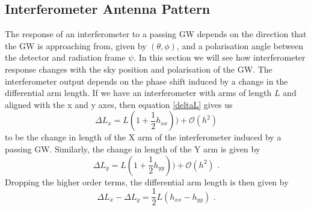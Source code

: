 \documentclass[11pt]{cuthesis}
\newcommand{\fs}{\text{ .}}
\begin{document}
\subsection{Interferometer Antenna Pattern} \label{sec:antenna pattern}
The response of an interferometer to a passing GW depends on the direction that the GW is approaching from, given by $(\theta,\phi)$, and a polarisation angle between the detector and radiation frame $\psi$. In this section we will see how interferometer response changes with the sky position and polarisation of the GW.\cite{maggiore} The interferometer output depends on the phase shift induced by a change in the differential arm length. If we have an interferometer with arms of length $L$ and aligned with the x and y axes, then equation \ref{deltaL} gives us
\begin{equation}
\Delta L_x = L (1 + \frac{1}{2}h_{xx})) + \mathcal{O}(h^2)
\end{equation} 
to be the change in length of the X arm of the interferometer induced by a passing GW. Similarly, the change in length of the Y arm is given by
\begin{equation}
\Delta L_y = L (1 + \frac{1}{2}h_{yy}))  + \mathcal{O}(h^2) \fs
\end{equation} 
Dropping the higher order terms, the differential arm length is then given by
\begin{equation} \label{darm eqn}
\Delta L_x - \Delta L_y = \frac{1}{2} L(h_{xx} - h_{yy}) \fs
\end{equation}
\end{document}

